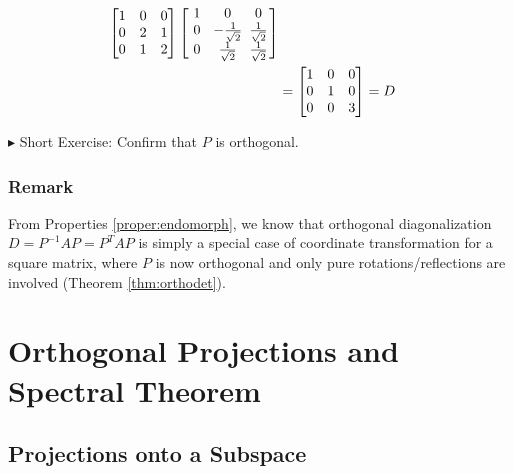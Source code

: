 \begin{solution}
\begin{align*}
\begin{bmatrix}
1 & 0 & 0 \\
0 & 2 & 1 \\
0 & 1 & 2
\end{bmatrix}
\left[\begin{array}{@{}wc{12pt}wc{12pt}wc{12pt}@{\,}}
1 & 0 & 0 \\
0 & -\frac{1}{\sqrt{2}} & \frac{1}{\sqrt{2}} \\
0 & \frac{1}{\sqrt{2}} & \frac{1}{\sqrt{2}}
\end{array}\right] \\
&= 
\begin{bmatrix}
1 & 0 & 0\\
0 & 1 & 0\\
0 & 0 & 3 
\end{bmatrix} = D
\end{align*}
\end{solution}
$\blacktriangleright$ Short Exercise: Confirm that $P$ is orthogonal.\footnotemark

\subsubsection{Remark} From Properties \ref{proper:endomorph}, we know that orthogonal diagonalization $D = P^{-1}AP = P^TAP$ is simply a special case of coordinate transformation for a square matrix, where $P$ is now orthogonal and only pure rotations/reflections are involved (Theorem \ref{thm:orthodet}).

\section{Orthogonal Projections and Spectral Theorem}

\subsection{Projections onto a Subspace}

